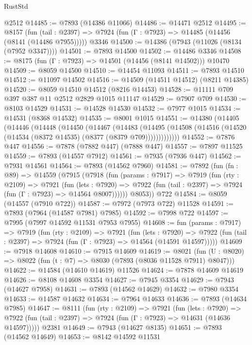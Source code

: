 \begin{lexlean}{RustStd}
\begin{coremodule}
    @2512
@14485 := @7893 (@14386 @11066)
@14486 := @14471 @2512
@14495 := @8157
    (fun (tail : @2397) => @7924 (fun (Γ : @7923) => @14485 (@14456 (@8141 (@14486 @7955)))))
    @3346
@14500 := @14386 (@7943 (@11026 (@8134 (@7952 @3347))))
@14501 := @7893 @14500
@14502 := @14486 @3346
@14508 := @8175 (fun (Γ : @7923) => @14501 (@14456 (@8141 @14502))) @10470
@14509 := @8059 @14500
@14510 := @14454 @11093
@14511 := @7893 @14510
@14512 := @11097 @14502
@14516 := @14509 (@14511 @14512) (@8211 @14385)
@14520 := @8059 @14510 @14512 (@8216 @14453)
@14528 := @11111 @709 @397 @387 @11 @2512 @2829 @1015 @11147
@14529 := @7907 @709
@14530 := @8103 @14529
@14531 := @14528 @14530
@14532 := @7977 @1015
@14534 := @14531 (@8368 @14532)
@14535 := @8001 @1015
@14551 := @14380
    (@14405
      (@14446
        (@14448
          (@14450
            (@14467
              (@14483
                (@14495
                  (@14508 (@14516 (@14520 (@14534 (@8372 @14535) (@8377 (@8379 @709)))))))))))))
@14552 := @7876 @447
@14556 := @7878 (@7882 @447) (@7888 @447)
@14557 := @7897 @11525
@14559 := @7893 (@14557 @7912)
@14561 := @7935 (@7936 @447)
@14562 := @7931 @14561
@14564 := @7893 (@14562 @7960)
@14581 := @7892
    (fun (fn : @89) =>
    @14559
      (@7915
        (@7918
          (fun (params : @7917) =>
          @7919
            (fun (rty : @2109) =>
            @7921
              (fun (lets : @7920) =>
              @7922 (fun (tail : @2397) => @7924 (fun (Γ : @7923) => @14564 @8007))))))
        @8053))
    @722
@14584 := @8059 (@14557 (@7910 @722))
@14587 := @7972 (@7973 @722) @11528
@14591 := @7893 (@7964 (@14587 @7981) @7985)
@14592 := @7998 @722
@14597 := @7995 (@7997 @14592 @11531 @7953 @7955)
@14608 := fun (params : @7917) =>
  @7919
    (fun (rty : @2109) =>
    @7921
      (fun (lets : @7920) =>
      @7922 (fun (tail : @2397) => @7924 (fun (Γ : @7923) => @14564 (@14591 @14597)))))
@14609 := @7918 @14608
@14610 := @7915 @14609
@14619 := @8021
    (fun (U : @8020) => @8022 (fun (t : @7) => @8030 (@7893 (@8036 @11528 @7911) @8047)))
@14622 := @14584 (@14610 @14619) @11526
@14624 := @7878 @14609 @14619
@14626 := @8108 @14608 @3354
@14627 := @7945 @3354
@14629 := @7943 (@14627 @7958)
@14631 := @7893 (@14562 @14629)
@14632 := @7980 @3354
@14633 := @14587 @14632
@14634 := @7964 @14633
@14636 := @7893 (@14634 @7985)
@14647 := @8111
    (fun (rty : @2109) =>
    @7921
      (fun (lets : @7920) =>
      @7922 (fun (tail : @2397) => @7924 (fun (Γ : @7923) => @14631 (@14636 @14597)))))
    @2381
@14649 := @7943 (@14627 @8135)
@14651 := @7893 (@14562 @14649)
@14653 := @8142 @14592 @11531

\end{coremodule}
\end{lexlean}
